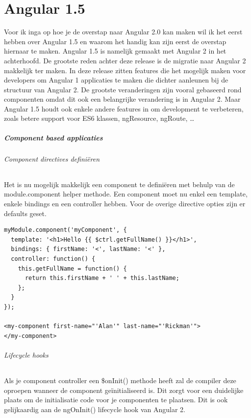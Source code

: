 \documentclass[pdftex,a4paper,12pt,twoside]{report}
\begin{document}
\chapter{Angular 1.5}
\label{ch:angular1.5}
Voor ik inga op hoe je de overstap naar Angular 2.0 kan maken wil ik het eerst hebben over Angular 1.5 en waarom het handig kan zijn eerst de overstap hiernaar te maken. Angular 1.5 is namelijk gemaakt met Angular 2 in het achterhoofd. De grootste reden achter deze release is de migratie naar Angular 2 makkelijk ter maken. In deze release zitten features die het mogelijk maken voor developers om Angular 1 applicaties te maken die dichter aanleunen bij de structuur van Angular 2.
\linebreak
\newline
De grootste veranderingen zijn vooral gebaseerd rond componenten omdat dit ook een belangrijke verandering is in Angular 2. Maar Angular 1.5 houdt ook enkele andere features in om development te verbeteren, zoals betere support voor ES6 klassen, ngResource, ngRoute, \ldots

\paragraph{Component based applicaties}
\subparagraph{Component directives defini\"eren}
\leavevmode
\newline
Het is nu mogelijk makkelijk een component te defini\"eren met behulp van de module.component helper methode. Een component moet nu enkel een template, enkele bindings en een controller hebben. Voor de overige directive opties zijn er defaults geset. 

\begin{lstlisting}[frame=single]
myModule.component('myComponent', {
  template: '<h1>Hello {{ $ctrl.getFullName() }}</h1>',
  bindings: { firstName: '<', lastName: '<' },
  controller: function() {
    this.getFullName = function() {
      return this.firstName + ' ' + this.lastName;
    };
  }
});

<my-component first-name="'Alan'" last-name="'Rickman'">
</my-component>
\end{lstlisting}


\subparagraph{Lifecycle hooks}
\leavevmode
\newline
Als je component controller een \$onInit() methode heeft zal de compiler deze oproepen wanneer de component ge\"initialiseerd is. Dit zorgt voor een duidelijke plaats om de initialisatie code voor je componenten te plaatsen. Dit is ook gelijkaardig aan de ngOnInit() lifecycle hook van Angular 2.
\end{document}

